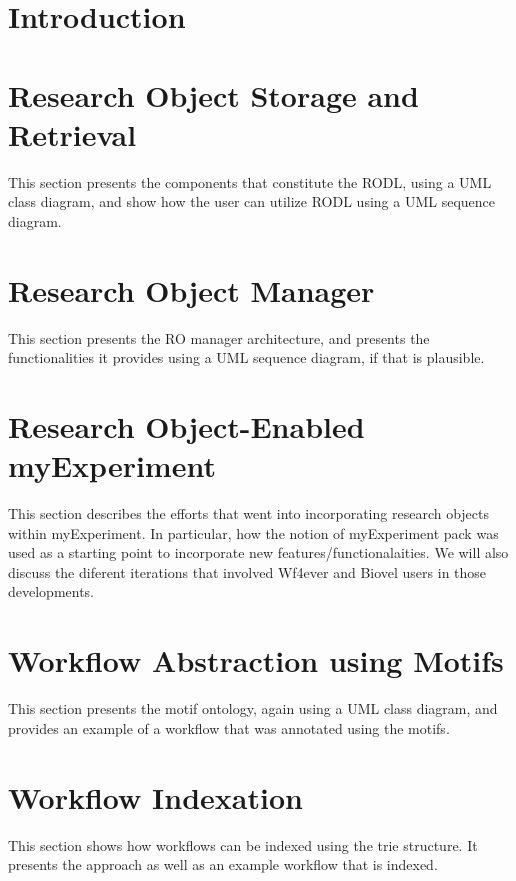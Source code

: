 \documentclass[a4paper, twoside, 11pt]{article}
\begin{document}
\section{Introduction}



\section{Research Object Storage and Retrieval}
This section presents the components that constitute the RODL, using a UML class diagram, and show how the user can utilize RODL using a UML sequence diagram.

\section{Research Object Manager}
This section presents the RO manager architecture, and presents the functionalities it provides using  a UML sequence diagram, if that is plausible. 

\section{Research Object-Enabled myExperiment}
This section describes the efforts that went into incorporating research objects within myExperiment. In particular, how the notion of myExperiment pack was used as a starting point to incorporate new features/functionalaities. We will also discuss the diferent iterations that involved Wf4ever and Biovel users in those developments.

\section{Workflow Abstraction using Motifs}
This section presents the motif ontology, again using a UML class diagram, and provides an example of a workflow that was annotated using the motifs.

\section{Workflow Indexation}
This section shows how workflows can be indexed using the trie structure. It presents the approach as well as an example workflow that is indexed.


\appendix
\clearpage
{}


\label{lastpage}
\end{document}
